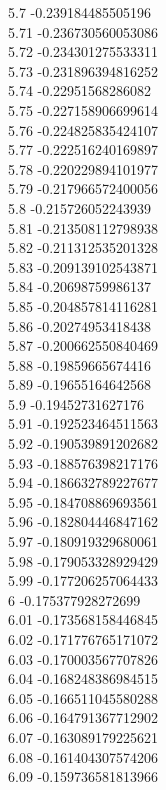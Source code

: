 {5.7	-0.239184485505196\\
5.71	-0.236730560053086\\
5.72	-0.234301275533311\\
5.73	-0.231896394816252\\
5.74	-0.22951568286082\\
5.75	-0.227158906699614\\
5.76	-0.224825835424107\\
5.77	-0.222516240169897\\
5.78	-0.220229894101977\\
5.79	-0.217966572400056\\
5.8	-0.215726052243939\\
5.81	-0.213508112798938\\
5.82	-0.211312535201328\\
5.83	-0.209139102543871\\
5.84	-0.20698759986137\\
5.85	-0.204857814116281\\
5.86	-0.20274953418438\\
5.87	-0.200662550840469\\
5.88	-0.19859665674416\\
5.89	-0.19655164642568\\
5.9	-0.19452731627176\\
5.91	-0.192523464511563\\
5.92	-0.190539891202682\\
5.93	-0.188576398217176\\
5.94	-0.186632789227677\\
5.95	-0.184708869693561\\
5.96	-0.182804446847162\\
5.97	-0.180919329680061\\
5.98	-0.179053328929429\\
5.99	-0.177206257064433\\
6	-0.175377928272699\\
6.01	-0.173568158446845\\
6.02	-0.171776765171072\\
6.03	-0.170003567707826\\
6.04	-0.168248386984515\\
6.05	-0.166511045580288\\
6.06	-0.164791367712902\\
6.07	-0.163089179225621\\
6.08	-0.161404307574206\\
6.09	-0.159736581813966\\
}
